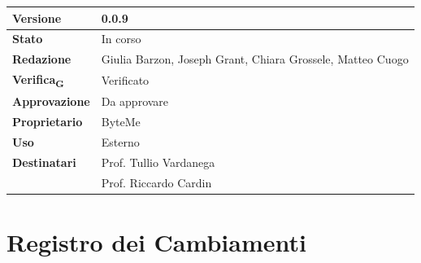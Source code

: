 \documentclass[11pt,a4paper]{article}
\newcommand{\gls}[1]{#1\textsubscript{G}}
\begin{document}
\begin{titlepage}
    \begin{table}[H]
        \centering
        \begin{tabular}{|l|p{5cm}|}
            \hline
            \textbf{Versione} & 0.0.9 \\
            \hline
            \textbf{Stato} & In corso \\
            \hline
            \textbf{Redazione} & Giulia Barzon, Joseph Grant, Chiara Grossele, Matteo Cuogo \\
            \hline
            \textbf{\gls{Verifica}} & Verificato \\
            \hline
            \textbf{Approvazione} & Da approvare\\
            \hline
            \textbf{Proprietario} & ByteMe \\
            \hline
            \textbf{Uso} & Esterno \\
            \hline
            \textbf{Destinatari} & Prof. Tullio Vardanega \\ & Prof. Riccardo Cardin \\
            \hline
        \end{tabular}
    \end{table}
    
    \vfill
\end{titlepage}

\thispagestyle{empty}
\section*{Registro dei Cambiamenti}
\end{document}
